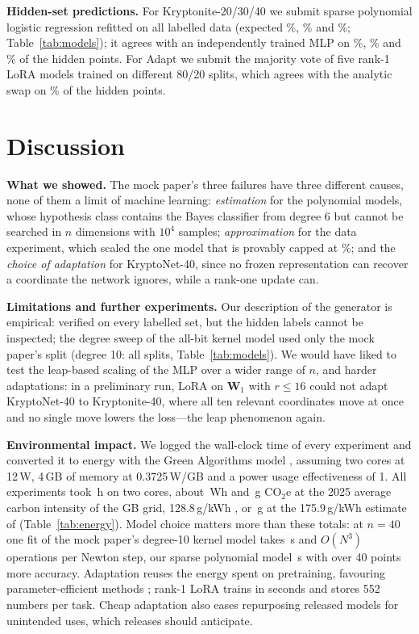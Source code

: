 \documentclass{article}
\newcommand{\csection}[1]{\section{\textcolor{imperialblue}{#1}}}
\theoremstyle{plain}
\newcommand{\W}{\mathbf{W}}
\begin{document}
\textbf{Hidden-set predictions.} For Kryptonite-20/30/40 we submit sparse polynomial logistic regression refitted on all labelled data (expected \SparseTwentyMean\%, \SparseThirtyMean\% and \SparseFortyMean\%; Table~\ref{tab:models}); it agrees with an independently trained MLP on \AgreeTwenty\%, \AgreeThirty\% and \AgreeForty\% of the hidden points. For Adapt we submit the majority vote of five rank-1 LoRA models trained on different 80/20 splits, which agrees with the analytic swap on \AgreeSwap\% of the hidden points.

\csection{Discussion}
\label{sec:discussion}
\textbf{What we showed.} The mock paper's three failures have three different causes, none of them a limit of machine learning: \emph{estimation} for the polynomial models, whose hypothesis class contains the Bayes classifier from degree 6 but cannot be searched in $n$ dimensions with $10^4$ samples; \emph{approximation} for the data experiment, which scaled the one model that is provably capped at \LimitTwo\%; and the \emph{choice of adaptation} for KryptoNet-40, since no frozen representation can recover a coordinate the network ignores, while a rank-one update can.

\textbf{Limitations and further experiments.} Our description of the generator is empirical: verified on every labelled set, but the hidden labels cannot be inspected; the degree sweep of the all-bit kernel model used only the mock paper's split (degree 10: all splits, Table~\ref{tab:models}). We would have liked to test the leap-based scaling of the MLP over a wider range of $n$, and harder adaptations: in a preliminary run, LoRA on $\W_1$ with $r\le16$ could not adapt KryptoNet-40 to Kryptonite-40, where all ten relevant coordinates move at once and no single move lowers the loss---the leap phenomenon again.

\textbf{Environmental impact.} We logged the wall-clock time of every experiment and converted it to energy with the Green Algorithms model \citep{lannelongue2021green}, assuming two cores at 12\,W, 4\,GB of memory at 0.3725\,W/GB and a power usage effectiveness of 1. All experiments took \TotalHours\,h on two cores, about \TotalWh\,Wh and \TotalG\,g CO$_2$e at the 2025 average carbon intensity of the GB grid, 128.8\,g/kWh \citep{energydashboard2026review}, or \TotalGhi\,g at the 175.9\,g/kWh estimate of \citet{electricitymaps2026gb} (Table~\ref{tab:energy}). Model choice matters more than these totals: at $n=40$ one fit of the mock paper's degree-10 kernel model takes \TimeKernel\,s and $O(N^3)$ operations per Newton step, our sparse polynomial model \TimeSparse\,s with over 40 points more accuracy. Adaptation reuses the energy spent on pretraining, favouring parameter-efficient methods \citep{strubell2019energy}; rank-1 LoRA trains in seconds and stores 552 numbers per task. Cheap adaptation also eases repurposing released models for unintended uses, which releases should anticipate.
\end{document}
